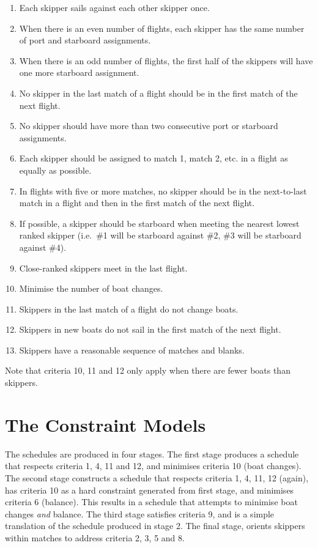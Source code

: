 \documentclass{llncs}
\begin{document}
\begin{enumerate}
\item Each skipper sails against each other skipper once.
\item When there is an even number of flights, each skipper has the same number
    of port and starboard assignments.
\item When there is an odd number of flights, the first half of the skippers
    will have one more starboard assignment.
\item No skipper in the last match of a flight should be in the first match of
    the next flight.
\item No skipper should have more than two consecutive port or starboard
    assignments.
\item Each skipper should be assigned to match 1, match 2, etc. in a flight as
    equally as possible.
\item In flights with five or more matches, no skipper should be in the
    next-to-last match in a flight and then in the first match of the next
    flight.
\item If possible, a skipper should be starboard when meeting the nearest
    lowest ranked skipper (i.e.\ \#1 will be starboard against \#2, \#3 will be
    starboard against \#4).
\item Close-ranked skippers meet in the last flight.
\item Minimise the number of boat changes.
\item Skippers in the last match of a flight do not change boats.
\item Skippers in new boats do not sail in the first match of the next flight.
\item Skippers have a reasonable sequence of matches and blanks.
\end{enumerate}

Note that criteria 10, 11 and 12 only apply when there are fewer boats than
skippers.

\section{The Constraint Models}

The schedules are produced in four stages. The first stage produces a schedule
that respects criteria 1, 4, 11 and 12, and minimises criteria 10 (boat
changes). The second stage constructs a schedule that respects criteria 1, 4,
11, 12 (again), has criteria 10 as a hard constraint generated from first
stage, and minimises criteria 6 (balance). This results in a schedule that
attempts to minimise boat changes \emph{and} balance. The third stage satisfies
criteria 9, and is a simple translation of the schedule produced in stage 2.
The final stage, orients skippers within matches to address criteria 2, 3, 5
and 8.
\end{document}

